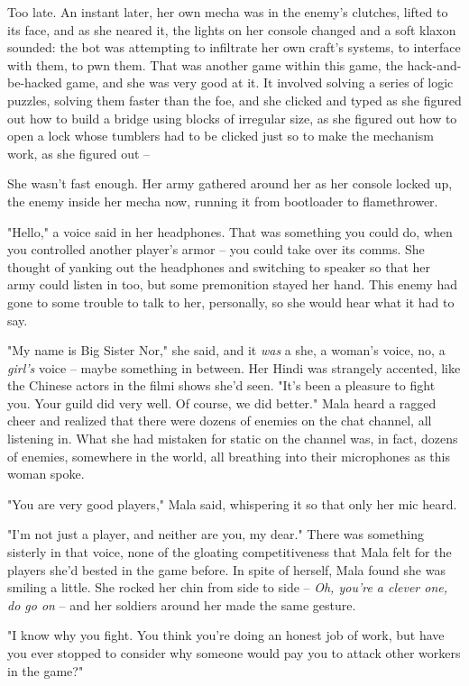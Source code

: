 Too late. An instant later, her own mecha was in the enemy's
clutches, lifted to its face, and as she neared it, the lights on
her console changed and a soft klaxon sounded: the bot was
attempting to infiltrate her own craft's systems, to interface with
them, to pwn them. That was another game within this game, the
hack-and-be-hacked game, and she was very good at it. It involved
solving a series of logic puzzles, solving them faster than the
foe, and she clicked and typed as she figured out how to build a
bridge using blocks of irregular size, as she figured out how to
open a lock whose tumblers had to be clicked just so to make the
mechanism work, as she figured out --

She wasn't fast enough. Her army gathered around her as her console
locked up, the enemy inside her mecha now, running it from
bootloader to flamethrower.

"Hello," a voice said in her headphones. That was something you
could do, when you controlled another player's armor -- you could
take over its comms. She thought of yanking out the headphones and
switching to speaker so that her army could listen in too, but some
premonition stayed her hand. This enemy had gone to some trouble to
talk to her, personally, so she would hear what it had to say.

"My name is Big Sister Nor," she said, and it \emph{was} a she, a
woman's voice, no, a \emph{girl's} voice -- maybe something in
between. Her Hindi was strangely accented, like the Chinese actors
in the filmi shows she'd seen. "It's been a pleasure to fight you.
Your guild did very well. Of course, we did better." Mala heard a
ragged cheer and realized that there were dozens of enemies on the
chat channel, all listening in. What she had mistaken for static on
the channel was, in fact, dozens of enemies, somewhere in the
world, all breathing into their microphones as this woman spoke.

"You are very good players," Mala said, whispering it so that only
her mic heard.

"I'm not just a player, and neither are you, my dear." There was
something sisterly in that voice, none of the gloating
competitiveness that Mala felt for the players she'd bested in the
game before. In spite of herself, Mala found she was smiling a
little. She rocked her chin from side to side --
\emph{Oh, you're a clever one, do go on} -- and her soldiers around
her made the same gesture.

"I know why you fight. You think you're doing an honest job of
work, but have you ever stopped to consider why someone would pay
you to attack other workers in the game?"

